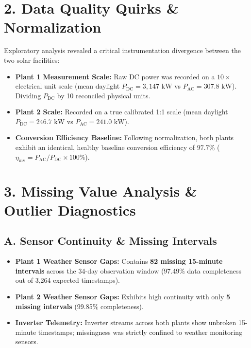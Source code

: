 \documentclass[10pt,a4paper]{article}
\begin{document}
\section*{2. Data Quality Quirks \& Normalization}
Exploratory analysis revealed a critical instrumentation divergence between the two solar facilities:
\begin{itemize}[leftmargin=14pt,itemsep=2pt,topsep=2pt,parsep=0pt]
    \item \textbf{Plant 1 Measurement Scale:} Raw DC power was recorded on a $10\times$ electrical unit scale (mean daylight $P_{\text{DC}} = 3,147\text{ kW}$ vs $P_{\text{AC}} = 307.8\text{ kW}$). Dividing $P_{\text{DC}}$ by 10 reconciled physical units.
    \item \textbf{Plant 2 Scale:} Recorded on a true calibrated 1:1 scale (mean daylight $P_{\text{DC}} = 246.7\text{ kW}$ vs $P_{\text{AC}} = 241.0\text{ kW}$).
    \item \textbf{Conversion Efficiency Baseline:} Following normalization, both plants exhibit an identical, healthy baseline conversion efficiency of $\mathbf{97.7\%}$ ($\eta_{\text{inv}} = P_{\text{AC}} / P_{\text{DC}} \times 100\%$).
\end{itemize}

\clearpage


\section*{3. Missing Value Analysis \& Outlier Diagnostics}

\subsection*{A. Sensor Continuity \& Missing Intervals}
\begin{itemize}[leftmargin=14pt,itemsep=2pt,topsep=2pt,parsep=0pt]
    \item \textbf{Plant 1 Weather Sensor Gaps:} Contains \textbf{82 missing 15-minute intervals} across the 34-day observation window (97.49\% data completeness out of 3,264 expected timestamps).
    \item \textbf{Plant 2 Weather Sensor Gaps:} Exhibits high continuity with only \textbf{5 missing intervals} (99.85\% completeness).
    \item \textbf{Inverter Telemetry:} Inverter streams across both plants show unbroken 15-minute timestamps; missingness was strictly confined to weather monitoring sensors.
\end{itemize}
\end{document}
